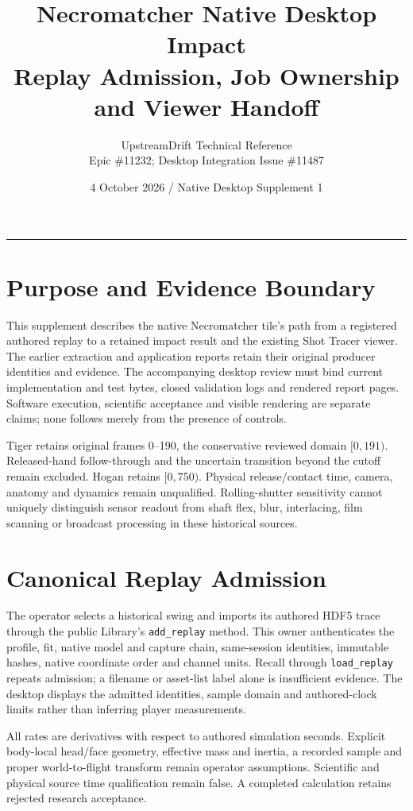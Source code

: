 \documentclass[11pt]{article}
\title{\textcolor{ink}{Necromatcher Native Desktop Impact\\Replay Admission, Job Ownership and Viewer Handoff}}
\author{UpstreamDrift Technical Reference\\Epic \#11232; Desktop Integration Issue \#11487}
\date{4 October 2026 / Native Desktop Supplement 1}
\newcommand{\code}[1]{\nolinkurl{#1}}
\begin{document}
\maketitle
\begin{center}\rule{0.9\linewidth}{0.6pt}\end{center}
\section*{Purpose and Evidence Boundary}
This supplement describes the native Necromatcher tile's path from a registered
authored replay to a retained impact result and the existing Shot Tracer viewer.
The earlier extraction and application reports retain their original producer
identities and evidence. The accompanying desktop review must bind current
implementation and test bytes, closed validation logs and rendered report pages.
Software execution, scientific acceptance and visible rendering are separate
claims; none follows merely from the presence of controls.

Tiger retains original frames 0--190, the conservative reviewed domain
$[0,191)$. Released-hand follow-through and the uncertain transition beyond the
cutoff remain excluded. Hogan retains $[0,750)$. Physical release/contact time,
camera, anatomy and dynamics remain unqualified. Rolling-shutter sensitivity
cannot uniquely distinguish sensor readout from shaft flex, blur, interlacing,
film scanning or broadcast processing in these historical sources.

\section*{Canonical Replay Admission}
The operator selects a historical swing and imports its authored HDF5 trace
through the public Library's \code{add_replay} method. This owner authenticates the
profile, fit, native model and capture chain, same-session identities, immutable
hashes, native coordinate order and channel units. Recall through
\code{load_replay} repeats admission; a filename or asset-list label alone is
insufficient evidence. The desktop displays the admitted identities, sample
domain and authored-clock limits rather than inferring player measurements.

All rates are derivatives with respect to authored simulation seconds. Explicit
body-local head/face geometry, effective mass and inertia, a recorded sample and
proper world-to-flight transform remain operator assumptions. Scientific and
physical source time qualification remain false.
A completed calculation retains rejected research acceptance.
\end{document}
